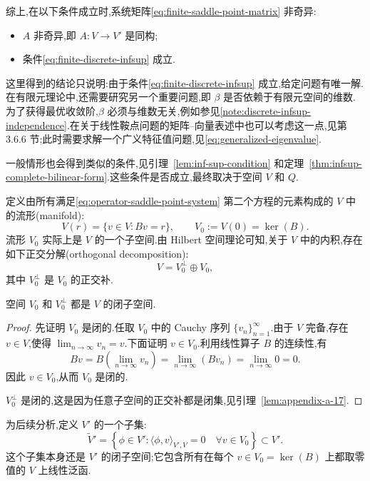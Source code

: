 综上,在以下条件成立时,系统矩阵\cref{eq:finite-saddle-point-matrix} 非奇异:
\begin{itemize}
  \item $A$ 非奇异,即 $A:V\to V'$ 是同构;
  \item 条件\cref{eq:finite-discrete-infsup} 成立.
\end{itemize}
这里得到的结论只说明:由于条件\cref{eq:finite-discrete-infsup} 成立,给定问题有唯一解.在有限元理论中,还需要研究另一个重要问题,即 $\beta$ 是否依赖于有限元空间的维数.为了获得最优收敛阶,$\beta$ 必须与维数无关,例如参见\cref{note:discrete-infsup-independence}.在关于线性鞍点问题的矩阵--向量表述中也可以考虑这一点,见第 3.6.6 节;此时需要求解一个广义特征值问题,见\cref{eq:generalized-eigenvalue}.

一般情形也会得到类似的条件,见引理~\ref{lem:inf-sup-condition} 和定理~\ref{thm:infsup-complete-bilinear-form}.这些条件是否成立,最终取决于空间 $V$ 和 $Q$.

\begin{note}[$V$ 中的流形与子空间]\label{note:manifold-v}
定义由所有满足\cref{eq:operator-saddle-point-system} 第二个方程的元素构成的 $V$ 中的流形(manifold):
\[
  V(r)=\{v\in V:Bv=r\},\qquad
  V_0:=V(0)=\ker(B).
\]
流形 $V_0$ 实际上是 $V$ 的一个子空间.由 Hilbert 空间理论可知,关于 $V$ 中的内积,存在如下正交分解(orthogonal decomposition):
\[
  V=V_0^{\perp}\oplus V_0,
\]
其中 $V_0^{\perp}$ 是 $V_0$ 的正交补.
\end{note}

\begin{lemma}\label{lem:closed-kernel-subspaces}
空间 $V_0$ 和 $V_0^{\perp}$ 都是 $V$ 的闭子空间.
\end{lemma}
\begin{proof}
先证明 $V_0$ 是闭的.任取 $V_0$ 中的 Cauchy 序列 $\{v_n\}_{n=1}^{\infty}$.由于 $V$ 完备,存在 $v\in V$,使得 $\lim_{n\to\infty}v_n=v$.下面证明 $v\in V_0$.利用线性算子 $B$ 的连续性,有
\[
  Bv=B\left(\lim_{n\to\infty}v_n\right)
  =\lim_{n\to\infty}(Bv_n)
  =\lim_{n\to\infty}0=0.
\]
因此 $v\in V_0$,从而 $V_0$ 是闭的.

$V_0^{\perp}$ 是闭的,这是因为任意子空间的正交补都是闭集,见引理~\ref{lem:appendix-a-17}.
\end{proof}





\begin{note}[在 $V_0$ 上消失的泛函]\label{note:functionals-vanishing-v0}
为后续分析,定义 $V'$ 的一个子集:
\begin{equation}\label{eq:v-tilde-dual}
  \widetilde{V}'=\left\{\phi\in V':
  \langle\phi,v\rangle_{V',V}=0\quad\forall v\in V_0\right\}\subset V'.
\end{equation}
这个子集本身还是 $V'$ 的闭子空间;它包含所有在每个 $v\in V_0=\ker(B)$ 上都取零值的 $V$ 上线性泛函.
\end{note}

